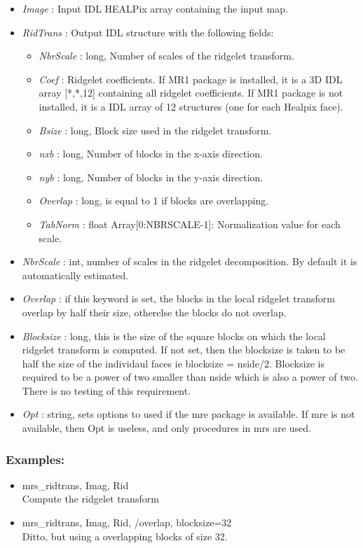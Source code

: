 \begin{itemize}
\item {\em Image} : Input IDL HEALPix array containing the input map.
\item {\em RidTrans} : Output IDL structure with the following fields: 
\begin{itemize} 
\item {\em NbrScale} : long, Number of scales of the ridgelet transform.
\item {\em Coef} : Ridgelet coefficients. If MR1 package is installed, it is a 3D IDL array [*,*,12] containing all ridgelet coefficients. 
If MR1 package is not installed, it is a IDL array of 12 structures (one for each Healpix face).
\item {\em Bsize} : long, Block size used in the ridgelet transform.
\item {\em nxb} : long, Number of blocks in the x-axis direction.
\item {\em nyb} : long, Number of blocks in the y-axis direction.
\item {\em Overlap} : long, is equal to 1 if blocks are overlapping.
\item {\em TabNorm} : float Array[0:NBRSCALE-1]: Normalization value for each scale.
\end{itemize}
\item {\em NbrScale} : int, number of scales in the ridgelet decomposition. By default it is automatically estimated.
\item {\em Overlap} : if this keyword is set, the blocks in the local ridgelet transform overlap by half their size, otherelse the blocks do not overlap.
\item {\em Blocksize} : long, this is the size of the square blocks on which the local ridgelet transform is computed. 
If not set, then the blocksize is taken to be half the size of the individaul faces ie blocksize = nside/2. Blocksize is 
required to be a power of two smaller than nside which is also a power of two. There is no testing of this requirement.
\item {\em Opt} : string, sets options to used if the mre package is available. If mre is not available, 
then Opt is useless, and only procedures in mrs are used.
\end{itemize}

\subsubsection*{Examples:} 
\begin{itemize}
\item mrs\_ridtrans, Imag, Rid   \\
Compute the ridgelet transform
\item mrs\_ridtrans, Imag, Rid, /overlap, blocksize=32 \\
Ditto, but using a overlapping blocks of size 32.
\end{itemize}



